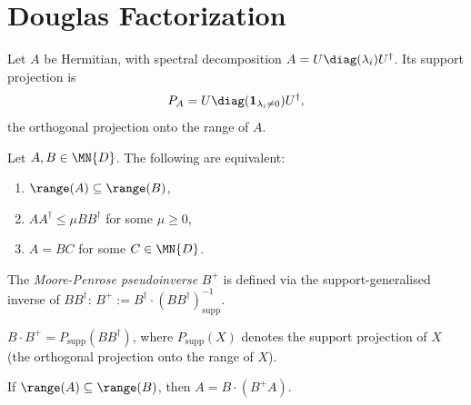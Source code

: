 \section{Douglas Factorization}\label{sec:douglas}

\begin{definition}
  \label{def:hermitian_support_projection}
  \leanok
  Let $A$ be Hermitian, with spectral decomposition
  $A=U\diag(\lambda_i)U^\dagger$. Its support projection is
  \begin{align}
    P_A=U\diag(\mathbf 1_{\lambda_i\ne 0})U^\dagger,
  \end{align}
  the orthogonal projection onto the range of $A$.
\end{definition}

\begin{theorem}\label{thm:douglas_tfae}
  \leanok
  Let $A, B \in \MN{D}$. The following are equivalent:
  \begin{enumerate}
    \item $\range(A) \subseteq \range(B)$,
    \item $A A^\dagger \le \mu B B^\dagger$ for some $\mu \ge 0$,
    \item $A = B C$ for some $C \in \MN{D}$.
  \end{enumerate}
\end{theorem}

\begin{definition}[Pseudoinverse]\label{def:pinv}
  \leanok
  The \emph{Moore-Penrose pseudoinverse} $B^+$ is defined via the support-generalised
  inverse of $B B^\dagger$:
  $B^+ := B^\dagger \cdot (B B^\dagger)^{-1}_{\mathrm{supp}}$.
\end{definition}

\begin{lemma}\label{lem:mul_pinv_eq_supportProj}
  \leanok
  $B \cdot B^+ = P_{\mathrm{supp}}(B B^\dagger)$,
  where $P_{\mathrm{supp}}(X)$ denotes the support projection of $X$
  (the orthogonal projection onto the range of $X$).
\end{lemma}

\begin{theorem}\label{thm:factorization_pinv}
  \leanok
  If $\range(A) \subseteq \range(B)$, then $A = B \cdot (B^+ A)$.
\end{theorem}

